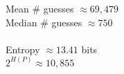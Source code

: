 \documentclass[12pt]{article}
\begin{document}
\thispagestyle{empty}

\noindent
Mean \# guesses $\approx 69,479$\\
Median \# guesses $\approx 750$\\
\ \\
Entropy $\approx 13.41$ bits\\
$2^{H(P)}\approx 10,855$

 
\end{document}
